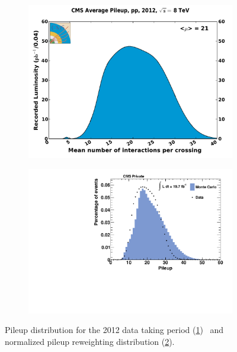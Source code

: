 \begin{figure}[htb!]
  \centering
  \begin{subfigure}[b]{0.495\textwidth}
    \centering
    \includegraphics[width=\textwidth]{plots/pileup_pp_2012.pdf}
    \caption{\label{fig:pileup2012}}
  \end{subfigure}
  \begin{subfigure}[b]{0.495\textwidth}
    \centering
    \includegraphics[width=\textwidth]{plots/pileup.pdf}
    \caption{\label{fig:pileup}}
  \end{subfigure}
  \caption{Pileup distribution for the 2012 data taking period (\ref{fig:pileup2012})~\cite{cmslumi} and normalized pileup reweighting distribution (\ref{fig:pileup}).}
  \label{fig:pileups}
\end{figure}

